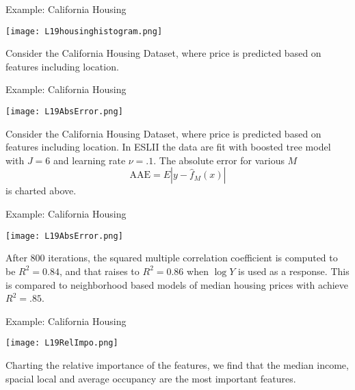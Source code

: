 \documentclass[10pt, table, dvipsnames,xcdraw, handout]{beamer}
\begin{document}
 \begin{frame}[fragile]{Example: California Housing}
   \begin{minipage}[t][0.8\textheight][t]{\textwidth}
	\centering \texttt{[image: L19housinghistogram.png]}
  \end{minipage}
  \vfill
\begin{minipage}[t][0.2\textheight][t]{\textwidth}
Consider the California Housing Dataset, where price is predicted based on features including location.
\end{minipage}
\end{frame}



 \begin{frame}[fragile]{Example: California Housing}
   \begin{minipage}[t][0.5\textheight][t]{\textwidth}
	\centering \texttt{[image: L19AbsError.png]}
  \end{minipage}
  \vfill
\begin{minipage}[t][0.5\textheight][t]{\textwidth}
Consider the California Housing Dataset, where price is predicted based on features including location. In ESLII the data are fit with boosted tree model with $J=6$ and learning rate $\nu = .1$. The absolute error for various $M$ 
$$
\text{AAE} = E|y-\hat{f}_M(x)|
$$
is charted above. 
\end{minipage}
\end{frame}


 \begin{frame}[fragile]{Example: California Housing}
   \begin{minipage}[t][0.5\textheight][t]{\textwidth}
	\centering \texttt{[image: L19AbsError.png]}
  \end{minipage}
  \vfill
\begin{minipage}[t][0.5\textheight][t]{\textwidth}
After 800 iterations, the squared multiple correlation coefficient is computed to be $R^2 = 0.84$, and that raises to $R^2 = 0.86$ when $\log Y$ is used as a response. This is compared to neighborhood based models of median housing prices with achieve $R^2 = .85$.
\end{minipage}
\end{frame}


 \begin{frame}[fragile]{Example: California Housing}
   \begin{minipage}[t][0.5\textheight][t]{\textwidth}
	\centering \texttt{[image: L19RelImpo.png]}
  \end{minipage}
  \vfill
\begin{minipage}[t][0.5\textheight][t]{\textwidth}
Charting the relative importance of the features, we find that the median income, spacial local and average occupancy are the most important features.
\end{minipage}
\end{frame}
\end{document}
